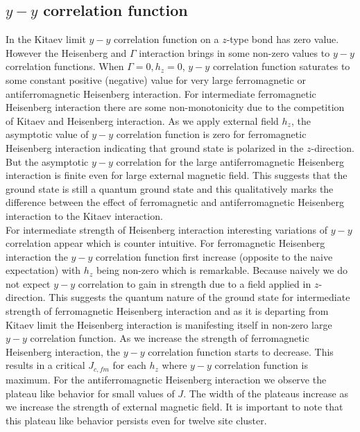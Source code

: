 \documentclass[aps,amsmath,twocolumn,amssymb,floatfix,showpacs,superscriptaddress,nofootinbib,longbibliography]{revtex4-1}
\begin{document}
\subsection{$y-y$ correlation function} In the Kitaev limit $y-y$ correlation function on a $z$-type bond has zero value. However the Heisenberg and $\Gamma$ interaction brings in some non-zero values to $y-y$ correlation functions. When $\Gamma=0, h_z=0$, $y-y$ correlation function
saturates to some constant positive (negative) value for very large ferromagnetic or antiferromagnetic Heisenberg interaction. For intermediate ferromagnetic Heisenberg interaction there are some non-monotonicity due to the competition of Kitaev and Heisenberg interaction. As we apply external field $h_z$, the asymptotic value of $y-y$ correlation function is zero for ferromagnetic Heisenberg interaction indicating that ground state is polarized in the $z$-direction. But the asymptotic $y-y$ correlation for the large antiferromagnetic Heisenberg interaction is finite even for large external magnetic field. This suggests that the ground state is still a quantum ground state and this qualitatively marks the difference between the effect of ferromagnetic and antiferromagnetic Heisenberg interaction to the Kitaev interaction.\\
\indent
For intermediate strength of Heisenberg interaction interesting variations of $y-y$ correlation appear which is counter intuitive. For ferromagnetic Heisenberg interaction  the $y-y$ correlation function first increase (opposite to the naive expectation) with $h_z$ being non-zero which is remarkable. Because naively we do not expect $y-y$ correlation to gain in strength due to a field applied in $z$-direction. This suggests the quantum nature of the ground state for intermediate strength of ferromagnetic Heisenberg interaction  and as it is departing from Kitaev limit the Heisenberg interaction is manifesting itself in non-zero large $y-y$ correlation function. As we increase the strength of ferromagnetic Heisenberg interaction, the $y-y$ correlation function starts to decrease.  This results in a critical $J_{c,fm}$ for each $h_z$ where $y-y$ correlation function is maximum. For the antiferromagnetic Heisenberg interaction we observe the plateau like behavior for small values of $J$. The width of the plateaus increase as we increase the strength of external magnetic field. It is important to note that this plateau like behavior persists even for twelve site cluster.\\
\end{document}
